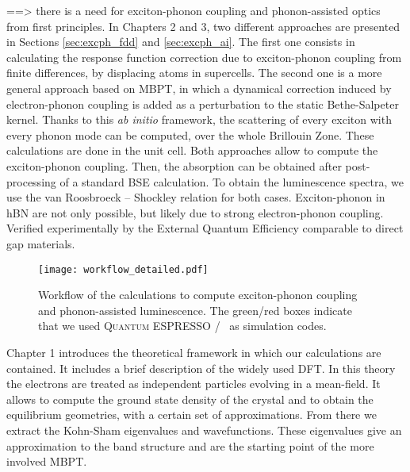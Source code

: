 ==> there is a need for exciton-phonon coupling and phonon-assisted optics from first principles. In Chapters 2 and 3, two different approaches are presented in Sections \ref{sec:excph_fdd} and \ref{sec:excph_ai}. The first one consists in calculating the response function correction due to exciton-phonon coupling from finite differences, by displacing atoms in supercells. The second one is a more general approach based on \acrshort{MBPT}, in which a dynamical correction induced by electron-phonon coupling is added as a perturbation to the static Bethe-Salpeter kernel. Thanks to this \textit{ab initio} framework, the scattering of every exciton with every phonon mode can be computed, over the whole Brillouin Zone. These calculations are done in the unit cell.
Both approaches allow to compute the exciton-phonon coupling. Then, the absorption can be obtained after post-processing of a standard \acrshort{BSE} calculation. To obtain the luminescence spectra, we use the van Roosbroeck -- Shockley relation for both cases.
Exciton-phonon in hBN are not only possible, but likely due to strong electron-phonon coupling. Verified experimentally by the External Quantum Efficiency comparable to direct gap materials.\\
\begin{figure}[h!b]
	\vspace{0.2cm}
	\setcapindent{2em}
	\centering
	\texttt{[image: workflow\_detailed.pdf]}
	\caption{Workflow of the calculations to compute exciton-phonon coupling and phonon-assisted luminescence. The green/red boxes indicate that we used \textsc{Quantum ESPRESSO} / \yambo~as simulation codes.}
	\label{fig:workflow}
\end{figure}



%
Chapter 1 introduces the theoretical framework in which our calculations are contained. It includes a brief description of the widely used \acrfull{DFT}. In this theory the electrons are treated as independent particles evolving in a mean-field. It allows to compute the ground state density of the crystal and to obtain the equilibrium geometries, with a certain set of approximations. From there we extract the Kohn-Sham eigenvalues and wavefunctions. These eigenvalues give an approximation to the band structure and are the starting point of the more involved \acrfull{MBPT}. 

